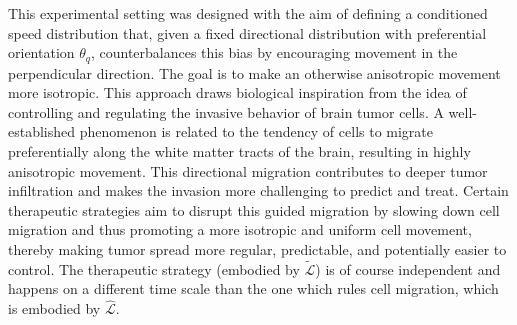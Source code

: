 \documentclass[a4paper]{article}
\theoremstyle{Theorem}\newtheorem{proposition}{Proposition}[section]
\theoremstyle{Remark}\newtheorem{remark}{Remark}[section]
\theoremstyle{Theorem}\newtheorem{theorem}{Theorem}[section]
\begin{document}
This experimental setting was designed with the aim of defining a conditioned speed distribution that, given a fixed directional distribution with preferential  orientation $\theta_q$, counterbalances this bias by encouraging movement in the perpendicular direction. The goal is to make an otherwise anisotropic movement more isotropic. This approach draws biological inspiration from the idea of controlling and regulating the invasive behavior of brain tumor cells. A well-established phenomenon is related to the tendency of cells to migrate preferentially along the white matter tracts of the brain, resulting in highly anisotropic movement. This directional migration contributes to deeper tumor infiltration and makes the invasion more challenging to predict and treat. Certain therapeutic strategies aim to disrupt this guided migration by slowing down cell migration and thus promoting a more isotropic and uniform cell movement, thereby making tumor spread more regular, predictable, and potentially easier to control. The therapeutic strategy (embodied by $\tilde{\mathcal{L}}$) is of course independent and happens on a different time scale than the one which rules cell migration, which is embodied by $\hat{\mathcal{L}}$.
\end{document}
